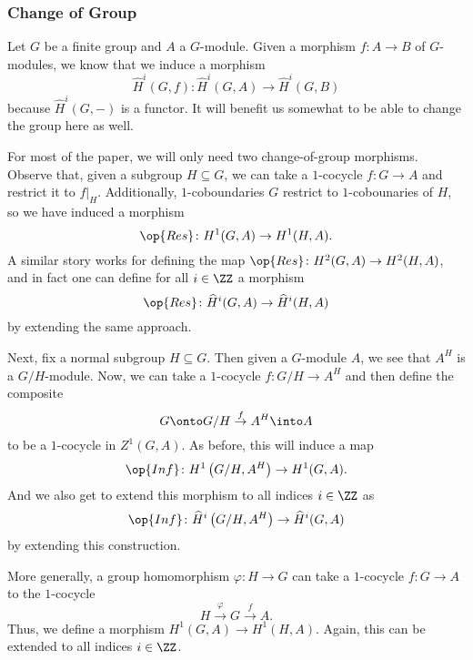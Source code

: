 \subsubsection{Change of Group}
Let $G$ be a finite group and $A$ a $G$-module. Given a morphism $f\colon A\to B$ of $G$-modules, we know that we induce a morphism
\[\widehat H^i(G,f)\colon\widehat H^i(G,A)\to\widehat H^i(G,B)\]
because $\widehat H^i(G,-)$ is a functor. It will benefit us somewhat to be able to change the group here as well.

For most of the paper, we will only need two change-of-group morphisms. Observe that, given a subgroup $H\subseteq G$, we can take a $1$-cocycle $f\colon G\to A$ and restrict it to $f|_H$. Additionally, $1$-coboundaries $G$ restrict to $1$-cobounaries of $H$, so we have induced a morphism
\[\op{Res}\colon H^1(G,A)\to H^1(H,A).\]
A similar story works for defining the map $\op{Res}\colon H^2(G,A)\to H^2(H,A)$, and in fact one can define for all $i\in\ZZ$ a morphism
\[\op{Res}\colon\widehat H^i(G,A)\to\widehat H^i(H,A)\]
by extending the same approach.

Next, fix a normal subgroup $H\subseteq G$. Then given a $G$-module $A$, we see that $A^H$ is a $G/H$-module. Now, we can take a $1$-cocycle $f\colon G/H\to A^H$ and then define the composite
\[G\onto G/H\stackrel f\to A^H\into A\]
to be a $1$-cocycle in $Z^1(G,A)$. As before, this will induce a map
\[\op{Inf}\colon H^1\left(G/H,A^H\right)\to H^1(G,A).\]
And we also get to extend this morphism to all indices $i\in\ZZ$ as
\[\op{Inf}\colon\widehat H^i\left(G/H,A^H\right)\to\widehat H^i(G,A)\]
by extending this construction.
\begin{remark} \label{rem:changeofgroup}
	More generally, a group homomorphism $\varphi\colon H\to G$ can take a $1$-cocycle $f\colon G\to A$ to the $1$-cocycle
	\[H\stackrel\varphi\to G\stackrel f\to A.\]
	Thus, we define a morphism $H^1(G,A)\to H^1(H,A)$. Again, this can be extended to all indices $i\in\ZZ$.
\end{remark}

